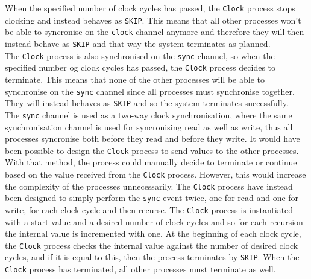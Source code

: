  When the specified number of clock cycles has passed, the \texttt{Clock} process stops clocking and instead behaves as \texttt{SKIP}. This means that all other processes won't be able to syncronise on the \texttt{clock} channel anymore and therefore they will then instead behave as \texttt{SKIP} and that way the system terminates as planned.\\


The \texttt{Clock} process is also synchronised on the \texttt{sync} channel, so when the specified number og clock cycles has passed, the \texttt{Clock} process decides to terminate.
This means that none of the other processes will be able to synchronise on the \texttt{sync} channel since all processes must synchronise together. They will instead behaves as \texttt{SKIP} and so the system terminates successfully.\\

The \texttt{sync} channel is used as a two-way clock synchronisation, where the same synchronisation channel is used for syncronising read as well as write, thus all processes syncronise both before they read and before they write. It would have been possible to design the \texttt{Clock} process to send values to the other processes. With that method, the process could manually decide to terminate or continue based on the value received from the \texttt{Clock} process. However, this would increase the complexity of the processes unnecessarily. The \texttt{Clock} process have instead been designed to simply perform the \texttt{sync} event twice, one for read and one for write, for each clock cycle and then recurse. The \texttt{Clock} process is instantiated with a start value and a desired number of clock cycles and so for each recursion the internal value is incremented with one. At the beginning of each clock cycle, the \texttt{Clock} process checks the internal value against the number of desired clock cycles, and if it is equal to this, then the process terminates by \texttt{SKIP}. When the \texttt{Clock} process has terminated, all other processes must terminate as well.
